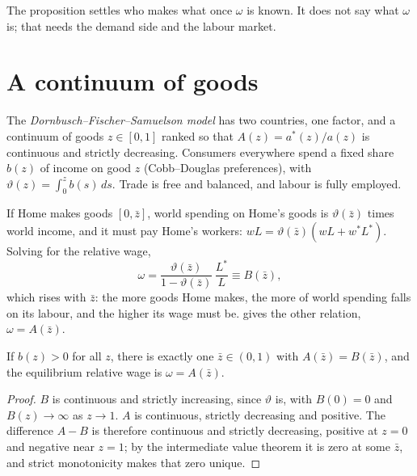 The proposition settles who makes what once $\omega$ is known. It does not say
what $\omega$ is; that needs the demand side and the labour market.

\section{A continuum of goods}\label{sec:b3:ricardian-trade:dfs}

\begin{definition}\label{def:b3:ricardian-trade:dfs}
The \emph{Dornbusch--Fischer--Samuelson model} has two countries, one factor,
and a continuum of goods $z \in [0, 1]$ ranked so that $A(z) = a^*(z)/a(z)$ is
continuous and strictly decreasing. Consumers everywhere spend a fixed share
$b(z)$ of income on good $z$ (Cobb--Douglas preferences), with $\vartheta(z) =
\int_0^z b(s)\, ds$. Trade is free and balanced, and labour is fully employed.
\end{definition}

If Home makes goods $[0, \bar z]$, world spending on Home's goods is $\vartheta(\bar
z)$ times world income, and it must pay Home's workers: $wL = \vartheta(\bar z)(wL +
w^*L^*)$. Solving for the relative wage,
\begin{equation}\label{eq:b3:rt:B}
  \omega = \frac{\vartheta(\bar z)}{1 - \vartheta(\bar z)}\,\frac{L^*}{L} \equiv B(\bar z),
\end{equation}
which rises with $\bar z$: the more goods Home makes, the more of world spending
falls on its labour, and the higher its wage must be. 
gives the other relation, $\omega = A(\bar z)$.

\begin{proposition}\label{prop:b3:ricardian-trade:dfs}
If $b(z) > 0$ for all $z$, there is exactly one $\bar z \in (0, 1)$ with $A(\bar z) =
B(\bar z)$, and the equilibrium relative wage is $\omega = A(\bar z)$.
\end{proposition}

\begin{proof}
$B$ is continuous and strictly increasing, since $\vartheta$ is, with $B(0) = 0$ and
$B(z) \to \infty$ as $z \to 1$. $A$ is continuous, strictly decreasing and positive.
The difference $A - B$ is therefore continuous and strictly decreasing, positive
at $z = 0$ and negative near $z = 1$; by the intermediate value theorem it is
zero at some $\bar z$, and strict monotonicity makes that zero unique.
\end{proof}

